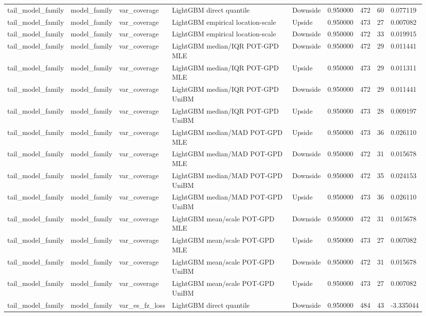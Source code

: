 \begin{tabular}{lllllrrr}
tail\_model\_family & model\_family & var\_coverage & LightGBM direct quantile & Downside & 0.950000 & 472 & 60 & 0.077119 \\
tail\_model\_family & model\_family & var\_coverage & LightGBM empirical location-scale & Upside & 0.950000 & 473 & 27 & 0.007082 \\
tail\_model\_family & model\_family & var\_coverage & LightGBM empirical location-scale & Downside & 0.950000 & 472 & 33 & 0.019915 \\
tail\_model\_family & model\_family & var\_coverage & LightGBM median/IQR POT-GPD MLE & Downside & 0.950000 & 472 & 29 & 0.011441 \\
tail\_model\_family & model\_family & var\_coverage & LightGBM median/IQR POT-GPD MLE & Upside & 0.950000 & 473 & 29 & 0.011311 \\
tail\_model\_family & model\_family & var\_coverage & LightGBM median/IQR POT-GPD UniBM & Downside & 0.950000 & 472 & 29 & 0.011441 \\
tail\_model\_family & model\_family & var\_coverage & LightGBM median/IQR POT-GPD UniBM & Upside & 0.950000 & 473 & 28 & 0.009197 \\
tail\_model\_family & model\_family & var\_coverage & LightGBM median/MAD POT-GPD MLE & Upside & 0.950000 & 473 & 36 & 0.026110 \\
tail\_model\_family & model\_family & var\_coverage & LightGBM median/MAD POT-GPD MLE & Downside & 0.950000 & 472 & 31 & 0.015678 \\
tail\_model\_family & model\_family & var\_coverage & LightGBM median/MAD POT-GPD UniBM & Downside & 0.950000 & 472 & 35 & 0.024153 \\
tail\_model\_family & model\_family & var\_coverage & LightGBM median/MAD POT-GPD UniBM & Upside & 0.950000 & 473 & 36 & 0.026110 \\
tail\_model\_family & model\_family & var\_coverage & LightGBM mean/scale POT-GPD MLE & Downside & 0.950000 & 472 & 31 & 0.015678 \\
tail\_model\_family & model\_family & var\_coverage & LightGBM mean/scale POT-GPD MLE & Upside & 0.950000 & 473 & 27 & 0.007082 \\
tail\_model\_family & model\_family & var\_coverage & LightGBM mean/scale POT-GPD UniBM & Downside & 0.950000 & 472 & 31 & 0.015678 \\
tail\_model\_family & model\_family & var\_coverage & LightGBM mean/scale POT-GPD UniBM & Upside & 0.950000 & 473 & 27 & 0.007082 \\
tail\_model\_family & model\_family & var\_es\_fz\_loss & LightGBM direct quantile & Downside & 0.950000 & 484 & 43 & -3.335044 \\

\end{tabular}
